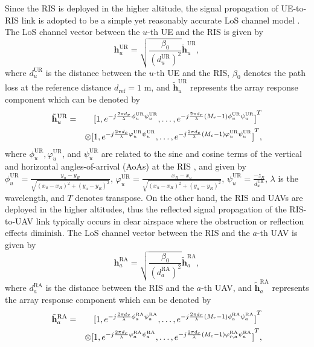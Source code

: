 \documentclass[conference]{IEEEtran}
\begin{document}
Since the RIS is deployed in the higher altitude, the signal propagation of UE-to-RIS link is adopted to be a simple yet reasonably accurate LoS channel model \cite{9293155}. The LoS channel vector between the $u$-th UE and the RIS is given by \cite{9293155}
\begin{equation}
\mathbf h^\text{UR}_{u}=\sqrt{\frac{\beta_0}{(d_{u}^\text{UR})^2}}\tilde{\mathbf h}^\text{UR}_{u},
\end{equation}
where $d_{u}^\text{UR}$ is the distance between the $u$-th UE and the RIS, $\beta_0$ denotes the path loss at the reference distance $d_\text{ref}=1$ m, and $\tilde{\mathbf h}^\text{UR}_{u}$ 
represents the array response component which can be denoted by
\begin{eqnarray}\nonumber
\tilde{\bold{h}}^\text{UR}_{u}&=&{[1,e^{-j\frac{2\pi d_{r}}{\lambda}\phi_{u}^\text{UR}\psi_{u}^\text{UR} },\ldots,e^{-j\frac{2\pi d_{r}}{\lambda}(M_{r}-1)\phi_{u}^\text{UR}\psi_{u}^\text{UR} }]}^{T}\\\nonumber
&~&\otimes {[1,e^{-j\frac{2\pi d_{c}}{\lambda}\varphi_{u}^\text{UR}\psi_{u}^\text{UR} },\ldots,e^{-j\frac{2\pi d_{c}}{\lambda}(M_{c}-1)\varphi_{u}^\text{UR}\psi_{u}^\text{UR} }]}^{T},
\end{eqnarray}
where $\phi_{u}^\text{UR}, \varphi_{u}^\text{UR}$, and $\psi_{u}^\text{UR}$ are related to the sine and cosine terms of the vertical and horizontal angles-of-arrival (AoAs)
at the RIS \cite{9293155}, and given by $\phi_{u}^\text{UR}=\frac{y_{u}-y_{R}}{\sqrt{(x_u-x_R)^2+(y_u-y_R)^2}}$, $\varphi_{u}^\text{UR}=\frac{x_{R}-x_{u}}{\sqrt{(x_u-x_R)^2+(y_u-y_R)^2}}$, $\psi_{u}^\text{UR}=\frac{-z_{R}}{d^\text{UR}_{u}}$, $\lambda$ is the wavelength, and $T$ denotes transpose. On the other hand, the RIS and UAVs are deployed in the higher altitudes, thus the reflected signal propagation of the RIS-to-UAV link typically occurs in clear airspace where the obstruction or reflection effects diminish. The LoS channel vector between the RIS and the $a$-th UAV is given by
\begin{equation}
\mathbf h^\text{RA}_{a}=\sqrt{\frac{\beta_0}{(d_{a}^\text{RA})^2}}\tilde{\mathbf h}^\text{RA}_{a},
\end{equation}
where $d_{a}^\text{RA}$ is the distance between the RIS and the $a$-th UAV, and $\tilde{\mathbf h}^\text{RA}_{a}$ 
represents the array response component which can be denoted by
\begin{eqnarray}\nonumber
\tilde{\bold{h}}^\text{RA}_{a}&=&{[1,e^{-j\frac{2\pi d_{r}}{\lambda}\phi_{a}^\text{RA}\psi_{a}^\text{RA} },\ldots,e^{-j\frac{2\pi d_{r}}{\lambda}(M_{r}-1)\phi_{a}^\text{RA}\psi_{a}^\text{RA} }]}^{T}\\\nonumber
&~&\otimes {[1,e^{-j\frac{2\pi d_{c}}{\lambda}\varphi_{a}^\text{RA}\psi_{a}^\text{RA} },\ldots,e^{-j\frac{2\pi d_{c}}{\lambda}(M_{c}-1)\varphi_{r,a}^\text{RA}\psi_{a}^\text{RA} }]}^{T},
\end{eqnarray}
\end{document}
